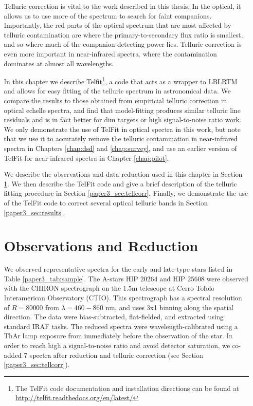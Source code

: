Telluric correction is vital to the work described in this thesis. In the optical, it allows us to use more of the spectrum to search for faint companions. Importantly, the red parts of the optical spectrum that are most affected by telluric contamination are where the primary-to-secondary flux ratio is smallest, and so where much of the companion-detecting power lies. Telluric correction is even more important in near-infrared spectra, where the contamination dominates at almost all wavelengths.

In this chapter we describe Telfit\footnote{The TelFit code documentation and installation directions can be found at \url{http://telfit.readthedocs.org/en/latest/}}, a code that acts as a wrapper to LBLRTM and allows for easy fitting of the telluric spectrum in astronomical data. We compare the results to those obtained from empiricial telluric correction in optical echelle spectra, and find that model-fitting produces similar telluric line residuals and is in fact better for dim targets or high signal-to-noise ratio work. We only demonstrate the use of TelFit in optical spectra in this work, but note that we use it to accurately remove the telluric contamination in near-infrared spectra in Chapters \ref{chap:dsd} and \ref{chap:survey}, and use an earlier version of TelFit for near-infrared spectra in Chapter \ref{chap:pilot}.


We describe the observations and data reduction used in this chapter in Section \ref{paper3_sec:obs}. We then describe the TelFit code and give a brief description of the telluric fitting procedure in Section \ref{paper3_sec:tellcorr}. Finally, we demonstrate the use of the TelFit code to correct several optical telluric bands in Section \ref{paper3_sec:results}. 




\section{Observations and Reduction}
\label{paper3_sec:obs}
We observed representative spectra for the early and late-type stars listed in Table \ref{paper3_tab:sample}. The A-stars HIP 20264 and HIP 25608 were observed with the CHIRON spectrograph on the 1.5m telescope at Cerro Tololo Interamerican Observatory (CTIO). This spectrograph has a spectral resolution of $R = 80000$ from $\lambda = 460 - 860$ nm, and uses 3x1 binning along the spatial direction. The data were bias-subtracted, flat-fielded, and extracted using standard IRAF tasks. The reduced spectra were wavelength-calibrated using a ThAr lamp exposure from immediately before the observation of the star. In order to reach high a signal-to-noise ratio and avoid detector saturation, we co-added 7 spectra after reduction and telluric correction (see Section \ref{paper3_sec:tellcorr}).

